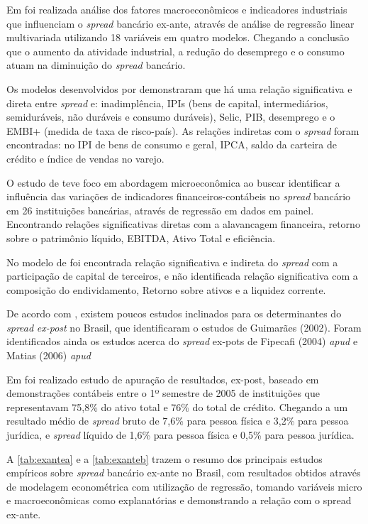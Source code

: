 \documentclass[12pt,openright,oneside,a4paper,chapter=TITLE,section=TITLE,subsection=Title,english,french,spanish,portugues,sumario=tradicional]{04-class-files/abntex2}
\begin{document}
Em \textcite{durigan:2018} foi realizada análise dos fatores macroeconômicos e
indicadores industriais que influenciam o \emph{spread} bancário ex-ante, através de
análise de regressão linear multivariada utilizando 18 variáveis em quatro
modelos. Chegando a conclusão que o aumento da atividade industrial, a redução
do desemprego e o consumo atuam na diminuição do \emph{spread} bancário.

Os modelos desenvolvidos por \textcite{durigan:2018} demonstraram que há uma relação significativa e direta entre \emph{spread} e: inadimplência, IPIs (bens de capital, intermediários, semiduráveis, não duráveis e consumo duráveis), Selic, PIB, desemprego e o EMBI+ (medida de taxa de risco-país). As relações indiretas com o \emph{spread} foram encontradas: no IPI de bens de consumo e geral, IPCA, saldo da carteira de crédito e índice de vendas no varejo.

O estudo de \textcite{timotio:2018} teve foco em abordagem microeconômica ao
buscar identificar a influência das variações de indicadores financeiros-contábeis no \emph{spread} bancário em 26 instituições bancárias,
através de regressão em dados em painel. Encontrando relações significativas diretas com a alavancagem financeira, retorno sobre o patrimônio líquido, EBITDA, Ativo Total e eficiência.

No modelo de \textcite{timotio:2018} foi encontrada relação significativa e indireta do \emph{spread} com a participação de capital de terceiros, e não identificada relação significativa com a composição do endividamento, Retorno sobre ativos e a liquidez corrente.

De acordo com \textcite{durigan:2018, dantas:2012}, existem poucos estudos inclinados para os determinantes do \emph{spread} \emph{ex-post} no Brasil, que identificaram o estudos de Guimarães (2002). Foram identificados ainda os estudos acerca do \emph{spread} ex-pots de Fipecafi (2004) \emph{apud} \textcite{dantas:2012} e Matias (2006) \emph{apud} \textcite{leal:2006}

Em \textcite{fipecafi:2005} foi realizado estudo de apuração de resultados, ex-post, baseado em demonstrações contábeis entre o 1º semestre de 2005 de instituições que representavam 75,8\% do ativo total e 76\% do total de crédito. Chegando a um resultado médio de \emph{spread} bruto de 7,6\% para pessoa física e 3,2\% para pessoa jurídica, e \emph{spread} líquido de 1,6\% para pessoa física e 0,5\% para pessoa jurídica.

A \autoref{tab:exantea} e a \autoref{tab:exanteb} trazem o resumo dos principais estudos empíricos sobre \emph{spread} bancário ex-ante no Brasil, com resultados obtidos através de modelagem econométrica com utilização de regressão, tomando variáveis micro e macroeconômicas como explanatórias e demonstrando a relação com o spread ex-ante.
\end{document}
